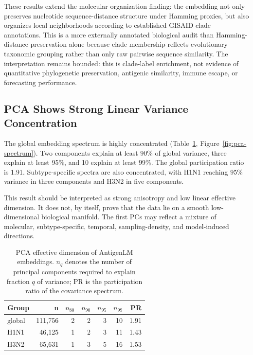 \documentclass[11pt]{article}
\begin{document}
These results extend the molecular organization finding: the embedding not only preserves nucleotide sequence-distance structure under Hamming proxies, but also organizes local neighborhoods according to established GISAID clade annotations. This is a more externally annotated biological audit than Hamming-distance preservation alone because clade membership reflects evolutionary-taxonomic grouping rather than only raw pairwise sequence similarity. The interpretation remains bounded: this is clade-label enrichment, not evidence of quantitative phylogenetic preservation, antigenic similarity, immune escape, or forecasting performance.

\subsection{PCA Shows Strong Linear Variance Concentration}

The global embedding spectrum is highly concentrated (Table~\ref{tab:pca}, Figure~\ref{fig:pca-spectrum}). Two components explain at least 90\% of global variance, three explain at least 95\%, and 10 explain at least 99\%. The global participation ratio is 1.91. Subtype-specific spectra are also concentrated, with H1N1 reaching 95\% variance in three components and H3N2 in five components.

This result should be interpreted as strong anisotropy and low linear effective dimension. It does not, by itself, prove that the data lie on a smooth low-dimensional biological manifold. The first PCs may reflect a mixture of molecular, subtype-specific, temporal, sampling-density, and model-induced directions.

\begin{table}[H]
\centering
\caption{PCA effective dimension of AntigenLM embeddings. $n_q$ denotes the number of principal components required to explain fraction $q$ of variance; PR is the participation ratio of the covariance spectrum.}
\label{tab:pca}
\begin{tabular}{lrrrrrr}
\toprule
Group & n & $n_{80}$ & $n_{90}$ & $n_{95}$ & $n_{99}$ & PR \\
\midrule
global & 111,756 & 2 & 2 & 3 & 10 & 1.91 \\
H1N1 & 46,125 & 1 & 2 & 3 & 11 & 1.43 \\
H3N2 & 65,631 & 1 & 3 & 5 & 16 & 1.53 \\
\bottomrule
\end{tabular}
\end{table}
\end{document}
